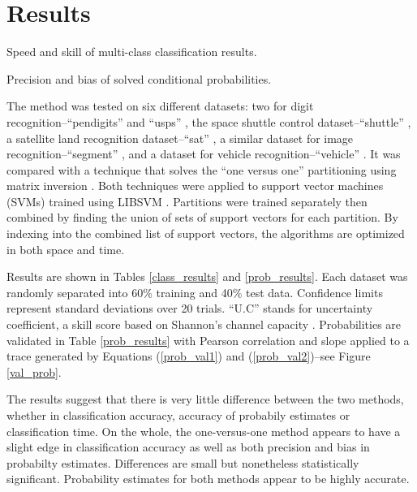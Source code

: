 \section{Results}

\begin{table}
\caption{Speed and skill of multi-class classification results.}\label{class_results}

\caption{Precision and bias of solved conditional probabilities.}\label{prob_results}

\end{table}

The method was tested on six different datasets:
two for digit recognition--``pendigits'' \citep{Alimoglu1996} and
``usps'' \citep{Hull1994}, the space shuttle control dataset--``shuttle''
\citep{King_etal1995}, a satellite land recognition
dataset--``sat'' \citep{King_etal1995}, 
a similar dataset for image recognition--``segment'' \citep{King_etal1995},
and a dataset for vehicle recognition--``vehicle'' \citep{Siebert1987}.
It was compared with a technique that solves the ``one versus one'' 
partitioning using matrix inversion \citep{Wu_etal2004}.
Both techniques were applied to support vector machines (SVMs) trained using
LIBSVM \citep{Chang_Lin2011}.
Partitions were trained separately then combined by finding the union of
sets of support vectors for each partition.
By indexing into the combined list of support vectors, the algorithms are
optimized in both space and time.

Results are shown in Tables \ref{class_results} and \ref{prob_results}.
Each dataset was randomly separated into 60\% training and 40\%
test data.
Confidence limits represent standard deviations over 20 trials.
``U.C'' stands for uncertainty
coefficient, a skill score based on Shannon's channel capacity
\citep{Shannon,Press_etal1992,Mills2011}.
Probabilities are validated in Table \ref{prob_results} with Pearson correlation and slope
applied to a trace generated by 
Equations (\ref{prob_val1}) and (\ref{prob_val2})--see Figure \ref{val_prob}.

The results suggest that there is very little difference between the two
methods, whether in classification accuracy, accuracy of probabily estimates
or classification time.
On the whole, the one-versus-one method appears to have a slight edge in
classification accuracy as well as both precision and bias in probabilty
estimates.
Differences are small but nonetheless statistically significant.
Probability estimates for both methods appear to be highly accurate.

